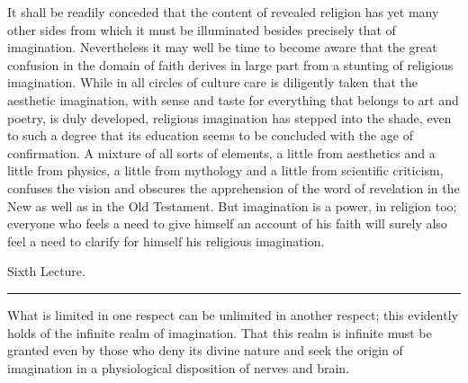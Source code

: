 \documentclass[12pt,a4paper,openany]{book}
\newcommand{\opage}[1]{\marginnote{\footnotesize\textit{[#1]}}}
\newcommand{\lecture}[1]{\clearpage\begin{center}{\large #1}\\[0.4em]\rule{3em}{0.4pt}\end{center}\medskip\noindent}
\begin{document}
It shall be readily conceded that the content of revealed
religion has yet many other sides
from which it must be illuminated besides precisely that of imagination. Nevertheless
it may well be time to become aware
that the great confusion in the domain of faith derives in
large part from a stunting of religious
imagination. While in all circles of culture
care is diligently taken that the aesthetic imagination, with
sense and taste for everything that belongs to art
and poetry, is duly developed, religious imagination
has stepped into the shade, even to such a degree that its
education seems to be concluded with the age of confirmation.
A mixture of all sorts of elements, a little from
aesthetics and a little from physics, a little from mythology and a little
from scientific criticism, confuses the vision and obscures
the apprehension of the word of revelation in the New as well as
in the Old Testament. But imagination is a power,
in religion too; everyone who feels a need to
give himself an account of his faith will surely also feel
a need to clarify for himself his religious imagination.

\setcounter{footnote}{0}%
\lecture{Sixth Lecture.}\opage{75}

What is limited in one respect can be unlimited in another respect; this evidently holds of the infinite realm of imagination. That this realm is infinite must be granted even by those who deny its divine nature and seek the origin of imagination in a physiological disposition of nerves and brain.
\end{document}
